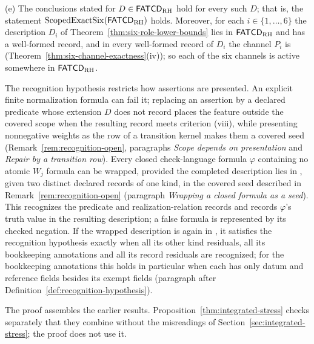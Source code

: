 \begin{theorem}
\par\noindent\textup{(e)} The conclusions stated for \(D\in\mathsf{FATCD}_{\mathrm{RH}}\) hold for every
such \(D\); that is, the statement \(\operatorname{ScopedExactSix}\!\left(\mathsf{FATCD}_{\mathrm{RH}}\right)\) holds. Moreover, for each
\(i\in\{1,\dots,6\}\) the description \(D_i\) of
Theorem~\ref{thm:six-role-lower-bounds} lies in \(\mathsf{FATCD}_{\mathrm{RH}}\) and has
a well-formed record, and in every well-formed record of \(D_i\) the channel
\(P_i\) is \activeproj{} (Theorem~\ref{thm:six-channel-exactness}(iv)); so each of the six
channels is active somewhere in \(\mathsf{FATCD}_{\mathrm{RH}}\).
\end{theorem}

The recognition hypothesis restricts how assertions are presented. An
explicit finite normalization formula can fail it; replacing an assertion by a declared predicate
whose extension \(D\) does not record places the feature outside the covered scope when the resulting record meets criterion (viii), while presenting
nonnegative weights as the row of a transition kernel makes them a covered \Pfour{} seed
(Remark~\ref{rem:recognition-open}, paragraphs \emph{Scope depends on presentation} and \emph{Repair by a transition row}). Every closed check-language formula \(\varphi\) containing no atomic \(W_j\)
formula can be wrapped, provided the completed description lies in \FATCD{}, given two
distinct declared records of one kind, in the covered \Ptwo{} seed described in
Remark~\ref{rem:recognition-open} (paragraph \emph{Wrapping a closed formula as a \Ptwo{} seed}). This recognizes the
predicate and realization-relation records and records \(\varphi\)'s truth
value in the resulting description; a false formula is represented by its checked negation. If the wrapped description is again in \FATCD{}, it satisfies the recognition hypothesis exactly when all its other kind residuals, all its bookkeeping annotations and all its record residuals are recognized; for the bookkeeping annotations this holds in particular when each has only datum and reference fields besides its exempt fields (paragraph after Definition~\ref{def:recognition-hypothesis}).

The proof assembles the earlier results. Proposition~\ref{thm:integrated-stress}
checks separately that they combine without the misreadings of
Section~\ref{sec:integrated-stress}; the proof does not use it.

